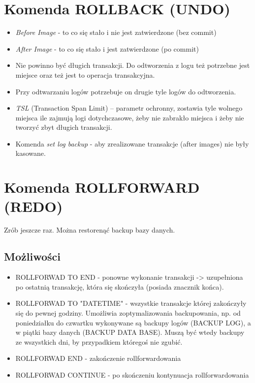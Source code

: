 \documentclass[a4paper,twoside]{article}
\begin{document}
  	\section*{Komenda ROLLBACK (UNDO)}
  	\begin{itemize}
  		\item \emph{Before Image} - to co się stało i nie jest zatwierdzone (bez commit)
  		\item \emph{After Image} - to co się stało i jest zatwierdzone (po commit)
  		\item Nie powinno być długich transakcji. Do odtworzenia z logu też potrzebne jest miejsce oraz też jest to operacja transakcyjna.
  		\item Przy odtwarzaniu logów potrzebuje on drugie tyle logów do odtworzenia.
  		\item \emph{TSL} (Transaction Span Limit) – parametr ochronny, zostawia tyle wolnego miejsca ile zajmują logi dotychczasowe, żeby nie zabrakło miejsca i żeby nie tworzyć zbyt długich transakcji.
  		\item Komenda \textit{set log backup} - aby zrealizowane transakcje (after images) nie były kasowane.
  	\end{itemize}
  	
  	\section*{Komenda ROLLFORWARD (REDO)}
  	Zrób jeszcze raz. Można restorenąć backup bazy danych.
  	\subsection*{Możliwości}
  	\begin{itemize}
  		\item ROLLFORWAD TO END - ponowne wykonanie transakcji -> uzupełniona po ostatnią transakcję, która się skończyła (posiada znacznik końca).
  		\item ROLLFORWAD TO "DATETIME" - wszystkie transakcje której zakończyły się do pewnej godziny. Umożliwia zoptymalizowania backupowania, np. od poniedziałku do czwartku wykonywane są backupy logów (BACKUP LOG), a w piątki bazy danych (BACKUP DATA BASE). Muszą być wtedy backupy ze wszystkich dni, by przypadkiem któregoś nie zgubić.
  		\item ROLLFORWAD END - zakończenie rollforwardowania
  		\item ROLLFORWAD CONTINUE - po skończeniu kontynuacja rollforwardowania
  	\end{itemize}
  	
\end{document}

